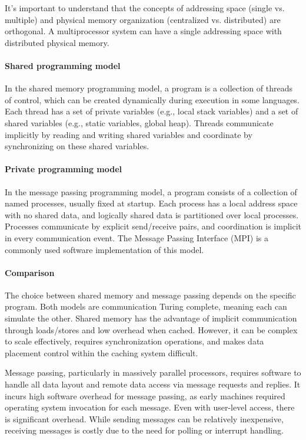It's important to understand that the concepts of addressing space (single vs. multiple) and physical memory organization (centralized vs. distributed) are orthogonal.
A multiprocessor system can have a single addressing space with distributed physical memory.

\paragraph*{Shared programming model}
In the shared memory programming model, a program is a collection of threads of control, which can be created dynamically during execution in some languages. 
Each thread has a set of private variables (e.g., local stack variables) and a set of shared variables (e.g., static variables, global heap).
Threads communicate implicitly by reading and writing shared variables and coordinate by synchronizing on these shared variables.

\paragraph*{Private programming model}
In the message passing programming model, a program consists of a collection of named processes, usually fixed at startup. Each process has a local address space with no shared data, and logically shared data is partitioned over local processes. Processes communicate by explicit send/receive pairs, and coordination is implicit in every communication event. 
The Message Passing Interface (MPI) is a commonly used software implementation of this model.

\paragraph*{Comparison}
The choice between shared memory and message passing depends on the specific program. 
Both models are communication Turing complete, meaning each can simulate the other. 
Shared memory has the advantage of implicit communication through loads/stores and low overhead when cached. 
However, it can be complex to scale effectively, requires synchronization operations, and makes data placement control within the caching system difficult.

Message passing, particularly in massively parallel processors, requires software to handle all data layout and remote data access via message requests and replies. 
It incurs high software overhead for message passing, as early machines required operating system invocation for each message. 
Even with user-level access, there is significant overhead. 
While sending messages can be relatively inexpensive, receiving messages is costly due to the need for polling or interrupt handling.

